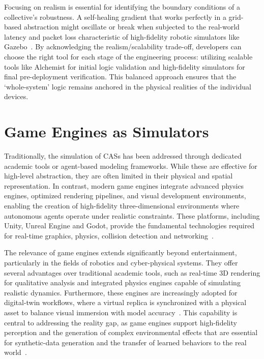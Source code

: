 Focusing on realism is essential for identifying the boundary conditions of a collective's robustness. A self-healing gradient that works perfectly in a grid-based abstraction might oscillate or break when subjected to the real-world latency and packet loss characteristic of high-fidelity robotic simulators like Gazebo~\cite{DBLP:conf/iros/KoenigH04}. By acknowledging the realism/scalability trade-off, developers can choose the right tool for each stage of the engineering process: utilizing scalable tools like Alchemist for initial logic validation and high-fidelity simulators for final pre-deployment verification. This balanced approach ensures that the `whole-system' logic remains anchored in the physical realities of the individual devices.

\section{Game Engines as Simulators}

Traditionally, the simulation of \aclp{CAS} has been addressed through dedicated academic tools or agent-based modeling frameworks. While these are effective for high-level abstraction, they are often limited in their physical and spatial representation. In contrast, modern game engines integrate advanced physics engines, optimized rendering pipelines, and visual development environments, enabling the creation of high-fidelity three-dimensional environments where autonomous agents operate under realistic constraints. These platforms, including Unity, Unreal Engine and Godot, provide the fundamental technologies required for real-time graphics, physics, collision detection and networking~\cite{Coronado2023XRGameEngines}.

The relevance of game engines extends significantly beyond entertainment, particularly in the fields of robotics and cyber-physical systems. They offer several advantages over traditional academic tools, such as real-time 3D rendering for qualitative analysis and integrated physics engines capable of simulating realistic dynamics. Furthermore, these engines are increasingly adopted for digital-twin workflows, where a virtual replica is synchronized with a physical asset to balance visual immersion with model accuracy~\cite{Singh2025UnityGazeboDT}. This capability is central to addressing the reality gap, as game engines support high-fidelity perception and the generation of complex environmental effects that are essential for synthetic-data generation and the transfer of learned behaviors to the real world~\cite{DBLP:conf/fsr/ShahDLK17}.


